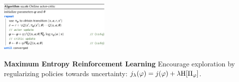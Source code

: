 \includegraphics[width=0.95\linewidth, trim={0 0 4cm 0}, height=2.5cm]{images/Online_actor_critic.png}
\begin{framed}
    \textbf{Maximum Entropy Reinforcement Learning}
    Encourage exploration by regularizing policies towards uncertainty: \(j_{\lambda}(\varphi)=j(\varphi)+\lambda \H{\Pi_{\varphi}}\).
\end{framed}
